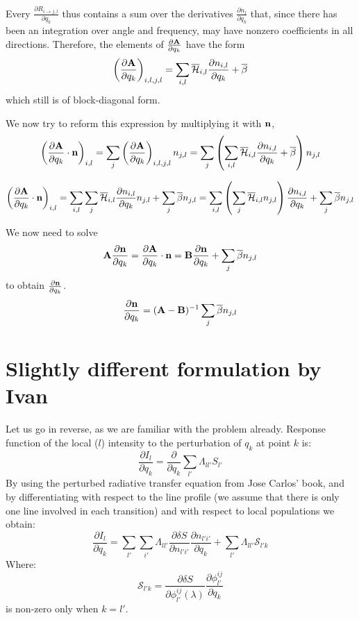 \documentclass[a4paper]{article}
\begin{document}
Every $\frac{\partial R_{i\rightarrow j,l}}{\partial q_k}$ thus contains a sum over the derivatives $\frac{\partial n_l}{\partial q_k}$ that, since there has been an integration over angle and frequency, may have nonzero coefficients in all directions. Therefore, the elements of $\frac{\partial {\bf A}}{\partial q_k}$ have the form 
$$
\left(\frac{\partial {\bf A}}{\partial q_k}\right)_{i,l,j,l}=\sum_{i,l} \overline{{\mathcal H}}_{i,l} \frac{\partial n_{i,l}}{\partial q_k} +\overline{\beta}
$$
which still is of block-diagonal form.

We now try to reform this expression by multiplying it with ${\bf n}$, 
$$
\left(\frac{\partial {\bf A}}{\partial q_k}\cdot{\bf n}\right)_{i,l}=\sum_{j} \left(\frac{\partial {\bf A}}{\partial q_k}\right)_{i,l,j,l} n_{j,l}=\sum_{j} \left( \sum_{i,l} \overline{{\mathcal H}}_{i,l} \frac{\partial n_{i,l}}{\partial q_k} +\overline{\beta}\right) n_{j,l}
$$

$$
\left(\frac{\partial {\bf A}}{\partial q_k}\cdot{\bf n}\right)_{i,l}=\sum_{i,l}\sum_{j}\overline{{\mathcal H}}_{i,l} \frac{\partial n_{i,l}}{\partial q_k}n_{j,l} +\sum_{j}\overline{\beta} n_{j,l}=\sum_{i,l}\left(\sum_{j}\overline{{\mathcal H}}_{i,l} n_{j,l}\right)\frac{\partial n_{i,l}}{\partial q_k} +\sum_{j}\overline{\beta} n_{j,l}
$$


We now need to solve
$$
{\bf A}\frac{\partial {\bf n}}{\partial q_k}=\frac{\partial {\bf A}}{\partial q_k}\cdot{\bf n}={\bf B}\frac{\partial {\bf n}}{\partial q_k}+\sum_{j}\overline{\beta} n_{j,l}
$$
to obtain $\frac{\partial {\bf n}}{\partial q_k}$. 
$$
\frac{\partial {\bf n}}{\partial q_k}=({\bf A-B})^{-1}\sum_{j}\overline{\beta} n_{j,l}
$$


\section{Slightly different formulation by Ivan}

Let us go in reverse, as we are familiar with the problem already. Response function of the local ($l$) intensity to the perturbation of $q_k$ at point $k$ is:
\begin{equation}
\frac{\partial I_l}{\partial q_k} = \frac{\partial}{\partial q_k} \sum_{l'} \Lambda_{ll'} S_{l'}
\end{equation}
By using the perturbed radiative transfer equation from Jose Carlos' book, and by differentiating with respect to the line profile (we assume that there is only one line involved in each transition) and with respect to local populations we obtain:
\begin{equation}
\frac{\partial I_l}{\partial q_k} = \sum_{l'} \sum_{i'} \Lambda_{ll'} \frac{\partial \delta S}{\partial n_{l'i'}} \frac{\partial n_{l'i'}}{\partial q_k} + \sum_{l'} \Lambda_{ll'} \mathcal{S}_{l'k}
\end{equation}
Where:
\begin{equation}
\mathcal{S}_{l'k} = \frac{\partial \delta S}{\partial \phi_{l'}^{ij}(\lambda)} \frac{\partial \phi_{l'}^{ij}}{\partial q_k}
\end{equation}
is non-zero only when $k = l'$. 
\\
\end{document}
